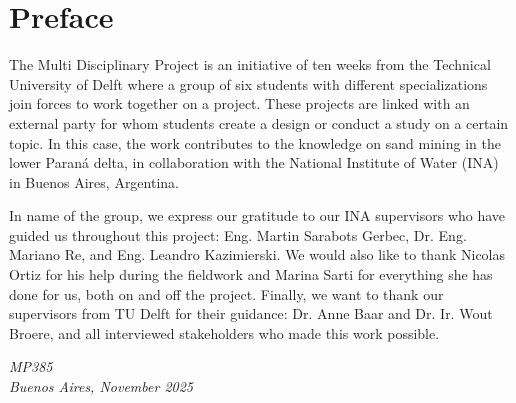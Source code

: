 \chapter*{Preface}

The Multi Disciplinary Project is an initiative of ten weeks from the Technical University of Delft where a group of six students with different specializations join forces to work together on a project. These projects are linked with an external party for whom students create a design or conduct a study on a certain topic. In this case, the work contributes to the knowledge on sand mining in the lower Paraná delta, in collaboration with the National Institute of Water (INA) in Buenos Aires, Argentina. 

In name of the group, we express our gratitude to our INA supervisors who have guided us throughout this project: Eng. Martin Sarabots Gerbec, Dr. Eng. Mariano Re, and Eng. Leandro Kazimierski. We would also like to thank Nicolas Ortiz for his help during the fieldwork and Marina Sarti for everything she has done for us, both on and off the project. Finally, we want to thank our supervisors from TU Delft for their guidance: Dr. Anne Baar and Dr. Ir. Wout Broere, and all interviewed stakeholders who made this work possible.

\begin{flushright}
{\makeatletter\itshape
    MP385 \\
    Buenos Aires, November 2025
\makeatother}
\end{flushright}